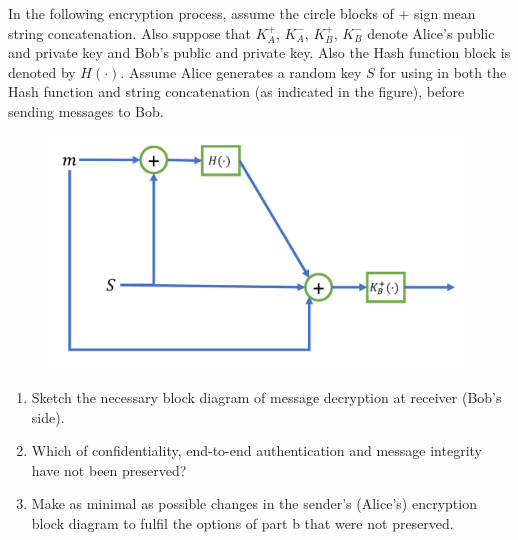 \documentclass[10pt,letterpaper]{article}
\begin{document}
In the following encryption process, assume the circle blocks of + sign mean string concatenation. Also suppose that $K_A^+$, $K_A^-$, $K_B^+$, $K_B^-$ denote Alice's public and private key and Bob's public and private key. Also the Hash function block is denoted by $H(\cdot)$. Assume Alice generates a random key $S$ for using in both the Hash function and string concatenation (as indicated in the figure), before sending messages to Bob.
\begin{figure}[htbp]
\centering
\includegraphics[width=110mm]{q6_1.pdf}
\end{figure}
\begin{enumerate}[label=\alph*-]
\item
Sketch the necessary block diagram of message decryption at receiver (Bob's side).
\item
Which of confidentiality, end-to-end authentication and message integrity have not been preserved?
\item
Make as minimal as possible changes in the sender's (Alice's) encryption block diagram to fulfil the options of part b that were not preserved.
\end{enumerate}
\end{document}
